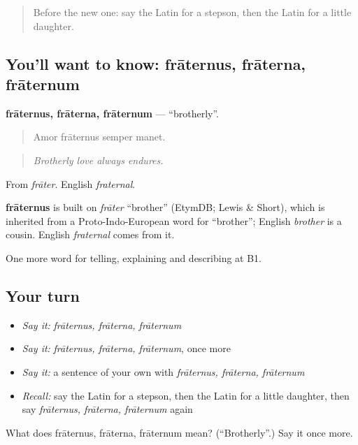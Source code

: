 \label{lesson:LA-C529-fraternus}



\begin{quote}
Before the new one: say the Latin for a stepson, then the Latin for a little daughter.
\end{quote}

\subsection*{You'll want to know: frāternus, frāterna, frāternum}
\textbf{frāternus, frāterna, frāternum} — \textquotedblleft{}brotherly\textquotedblright{}.

\begin{quote}
Amor frāternus semper manet.
\end{quote}

\begin{quote}
\emph{Brotherly love always endures.}
\end{quote}

From \emph{frāter}. English \emph{fraternal}.

\begin{cousinweb}
\textbf{frāternus} is built on \emph{frāter} \textquotedblleft{}brother\textquotedblright{} (EtymDB; Lewis \& Short), which is inherited from a Proto-Indo-European word for \textquotedblleft{}brother\textquotedblright{}; English \emph{brother} is a cousin. English \emph{fraternal} comes from it.
\end{cousinweb}

\begin{grammarlens}[title={What you've built}]
One more word for telling, explaining and describing at B1.
\end{grammarlens}

\subsection*{Your turn}
\begin{itemize}
\raggedright
  \item \emph{Say it:} \emph{frāternus, frāterna, frāternum}
  \item \emph{Say it:} \emph{frāternus, frāterna, frāternum}, once more
  \item \emph{Say it:} a sentence of your own with \emph{frāternus, frāterna, frāternum}
  \item \emph{Recall:} say the Latin for a stepson, then the Latin for a little daughter, then say \emph{frāternus, frāterna, frāternum} again
\end{itemize}

\begin{tcolorbox}[breakable,colback=teal!4,colframe=teal!35!black,title={Before you move on}]
What does frāternus, frāterna, frāternum mean? (\textquotedblleft{}Brotherly\textquotedblright{}.) Say it once more.
\end{tcolorbox}
